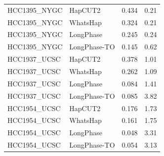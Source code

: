 \documentclass[pdflatex,sn-nature]{sn-jnl}
\begin{document}
\begin{table}[htbp]
\begin{tabular}{@{}llrr@{}}
    HCC1395\_NYGC & HapCUT2 & 0.434 & 0.21 \\
    HCC1395\_NYGC & WhatsHap & 0.324 & 0.21 \\
    HCC1395\_NYGC & LongPhase & 0.245 & 0.24 \\
    HCC1395\_NYGC & LongPhase-TO & 0.145 & 0.62 \\
    \addlinespace
    HCC1937\_UCSC & HapCUT2 & 0.378 & 1.01 \\
    HCC1937\_UCSC & WhatsHap & 0.262 & 1.09 \\
    HCC1937\_UCSC & LongPhase & 0.084 & 1.41 \\
    HCC1937\_UCSC & LongPhase-TO & 0.085 & 3.82 \\
    \addlinespace
    HCC1954\_UCSC & HapCUT2 & 0.176 & 1.73 \\
    HCC1954\_UCSC & WhatsHap & 0.161 & 1.75 \\
    HCC1954\_UCSC & LongPhase & 0.048 & 3.31 \\
    HCC1954\_UCSC & LongPhase-TO & 0.054 & 3.13 \\
    \bottomrule
  \end{tabular}
\end{table}
\end{document}
